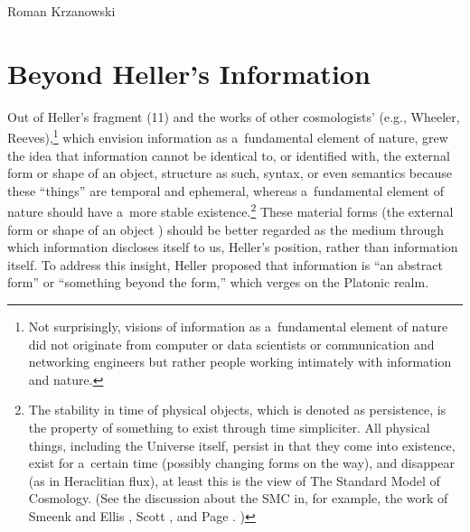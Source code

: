 \begin{artengenv}{Roman Krzanowski}
\section{Beyond Heller's Information}

Out of Heller's fragment (11) and the works of other cosmologists' (e.g., Wheeler, Reeves),\footnote{Not surprisingly, visions of information as a~fundamental element of nature did not originate from computer or data scientists or communication and networking engineers but rather people working intimately with information and nature.} which envision information as a~fundamental element of nature, grew the idea that information cannot be identical to, or identified with, the external form or shape of an object, structure as such, syntax, or even semantics because these ``things'' are temporal and ephemeral, whereas a~fundamental element of nature should have a~more stable existence.\footnote{The stability in time of physical objects, which is denoted as persistence, is the property of something to exist through time simpliciter. All physical things, including the Universe itself, persist in that they come into existence, exist for a~certain time (possibly changing forms on the way), and disappear (as in Heraclitian flux), at least this is the view of The Standard Model of Cosmology. (See the discussion about the SMC in, for example, the work of Smeenk and Ellis 
\parencite*[][]{smeenk_philosophy_2017}, %
 Scott 
\parencite*[][]{scott_standard_2018}, %
 and Page 
\parencite*[][]{page_little_2020}.%
) } These material forms (the external form or shape of an object ) should be better regarded as the medium through which information discloses itself to us, Heller's position, rather than information itself. To address this insight, Heller proposed that information is ``an abstract form'' or ``something beyond the form,'' which verges on the Platonic realm.




\end{artengenv}
